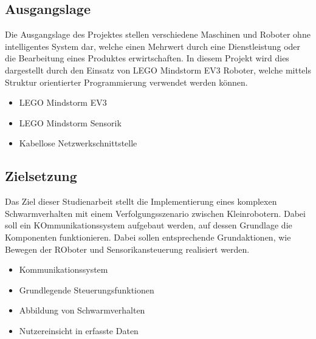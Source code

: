 \newpage
\subsection{Ausgangslage}

Die Ausgangslage des Projektes stellen verschiedene Maschinen und Roboter ohne intelligentes System dar, welche einen Mehrwert durch eine Dienstleistung oder die Bearbeitung eines Produktes erwirtschaften. In diesem Projekt wird dies dargestellt durch den Einsatz von LEGO Mindstorm EV3 Roboter, welche mittels Struktur orientierter Programmierung verwendet werden können.

\begin{itemize}
	\item LEGO Mindstorm EV3
	\item LEGO Mindstorm Sensorik
	\item Kabellose Netzwerkschnittstelle
\end{itemize}

\begin{comment}
	Die Aufgangslage stellen die einzelnen ROboter dar, die unter der Mindstorm SOftware funktionieren und dadurch einzeln agieren können. Dabei ist keinerlei Kommunikation zwischen den einzelnen ROboter möglich und somit keinerlei Realisierung für ein Schwarmverhalten. Die Roboter haben verschiedene Möglichkeiten durch WLAN, Bluetooth zur KOmmunikation, wobei keines von LEGO MIndstorm dirket zur Verfügung steht. Diese Schnittstellen werden lediglich zur Nutzerinteraktion, sowie dem drahtlosen starten und debuugen der Software genutzt.
\end{comment}

\subsection{Zielsetzung}

Das Ziel dieser Studienarbeit stellt die Implementierung eines komplexen Schwarmverhalten mit einem Verfolgungsszenario zwischen Kleinrobotern. Dabei soll ein KOmmunikationssystem aufgebaut werden, auf dessen Grundlage die Komponenten funktionieren. Dabei sollen entsprechende Grundaktionen, wie Bewegen der ROboter und Sensorikansteuerung realisiert werden.

\begin{itemize}
	\item Kommunikationssystem
	\item Grundlegende Steuerungsfunktionen
	\item Abbildung von Schwarmverhalten
	\item Nutzereinsicht in erfasste Daten
\end{itemize}

